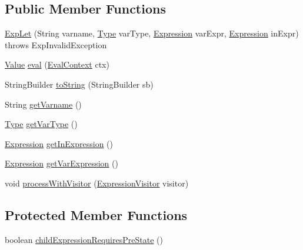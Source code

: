 \subsection*{Public Member Functions}
\begin{DoxyCompactItemize}
\item 
\hyperlink{classorg_1_1tzi_1_1use_1_1uml_1_1ocl_1_1expr_1_1_exp_let_af5a2614d5d7da5b06054b166d19e0cbf}{Exp\-Let} (String varname, \hyperlink{interfaceorg_1_1tzi_1_1use_1_1uml_1_1ocl_1_1type_1_1_type}{Type} var\-Type, \hyperlink{classorg_1_1tzi_1_1use_1_1uml_1_1ocl_1_1expr_1_1_expression}{Expression} var\-Expr, \hyperlink{classorg_1_1tzi_1_1use_1_1uml_1_1ocl_1_1expr_1_1_expression}{Expression} in\-Expr)  throws Exp\-Invalid\-Exception     
\item 
\hyperlink{classorg_1_1tzi_1_1use_1_1uml_1_1ocl_1_1value_1_1_value}{Value} \hyperlink{classorg_1_1tzi_1_1use_1_1uml_1_1ocl_1_1expr_1_1_exp_let_a218c542d36246a35416f38f285075d5b}{eval} (\hyperlink{classorg_1_1tzi_1_1use_1_1uml_1_1ocl_1_1expr_1_1_eval_context}{Eval\-Context} ctx)
\item 
String\-Builder \hyperlink{classorg_1_1tzi_1_1use_1_1uml_1_1ocl_1_1expr_1_1_exp_let_a15229cf9bad860890e098684b950243f}{to\-String} (String\-Builder sb)
\item 
String \hyperlink{classorg_1_1tzi_1_1use_1_1uml_1_1ocl_1_1expr_1_1_exp_let_a3a0dd8fc464933bb0a4b2f1617499661}{get\-Varname} ()
\item 
\hyperlink{interfaceorg_1_1tzi_1_1use_1_1uml_1_1ocl_1_1type_1_1_type}{Type} \hyperlink{classorg_1_1tzi_1_1use_1_1uml_1_1ocl_1_1expr_1_1_exp_let_a119669df6d2105bd5ea7785ae8f954d5}{get\-Var\-Type} ()
\item 
\hyperlink{classorg_1_1tzi_1_1use_1_1uml_1_1ocl_1_1expr_1_1_expression}{Expression} \hyperlink{classorg_1_1tzi_1_1use_1_1uml_1_1ocl_1_1expr_1_1_exp_let_abf50846c0b69303d69fbc795279d46c2}{get\-In\-Expression} ()
\item 
\hyperlink{classorg_1_1tzi_1_1use_1_1uml_1_1ocl_1_1expr_1_1_expression}{Expression} \hyperlink{classorg_1_1tzi_1_1use_1_1uml_1_1ocl_1_1expr_1_1_exp_let_a5b0ce8eba058f9dfc01d44c4e16502f7}{get\-Var\-Expression} ()
\item 
void \hyperlink{classorg_1_1tzi_1_1use_1_1uml_1_1ocl_1_1expr_1_1_exp_let_a5ea6701cc4f68f0e5beecbf7f2073a96}{process\-With\-Visitor} (\hyperlink{interfaceorg_1_1tzi_1_1use_1_1uml_1_1ocl_1_1expr_1_1_expression_visitor}{Expression\-Visitor} visitor)
\end{DoxyCompactItemize}
\subsection*{Protected Member Functions}
\begin{DoxyCompactItemize}
\item 
boolean \hyperlink{classorg_1_1tzi_1_1use_1_1uml_1_1ocl_1_1expr_1_1_exp_let_a4db10e0fe809563bdfe8ae4f934777be}{child\-Expression\-Requires\-Pre\-State} ()
\end{DoxyCompactItemize}


